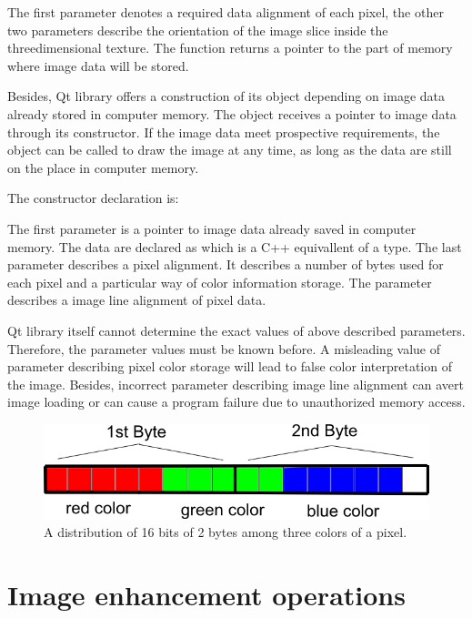 The first parameter denotes a required data alignment of each pixel, the other two parameters describe the orientation of the image slice inside the threedimensional texture. The function returns a pointer to the part of memory where image data will be stored.

Besides, Qt library offers a construction of its object depending on image data already stored in computer memory. The object receives a pointer to image data through its constructor. If the image data meet prospective requirements, the object can be called to draw the image at any time, as long as the data are still on the place in computer memory.

The constructor declaration is:


The first parameter is a pointer to image data already saved in computer memory. The data are declared as  which is a C++ equivallent of a  type. The last parameter  describes a pixel alignment. It describes a number of bytes used for each pixel and a particular way of color information storage. The  parameter describes a image line alignment of pixel data.

Qt library itself cannot determine the exact values of above described parameters. Therefore, the parameter values must be known before. A misleading value of parameter describing pixel color storage will lead to false color interpretation of the image. Besides, incorrect parameter describing image line alignment can avert image loading or can cause a program failure due to unauthorized memory access.  


\begin{figure}
	\begin{center}
	\includegraphics[width=130mm]{Text/IMG/ImageStoring_16bit.png}
	\end{center}
	\caption{A distribution of 16 bits of 2 bytes among three colors of a pixel.}
	\label{screenshot}
\end{figure}

\section{Image enhancement operations}
\label{brightnesscontrast}

